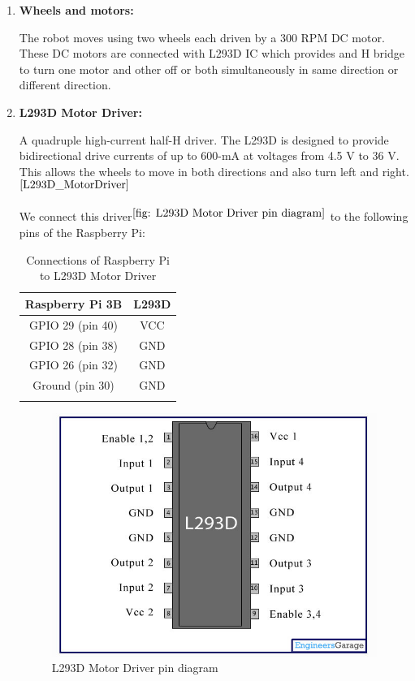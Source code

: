 \begin{enumerate}[topsep=-2pt, itemsep=2pt]
			
		
		
		
			
		\clearpage
		
		\item \textbf{Wheels and motors:} 
		
			The robot moves using two wheels each driven by a 300 RPM DC motor. These DC motors are connected with L293D IC which provides and H bridge to turn one motor and other off or both simultaneously in same direction or different direction. 
		
		
		\item \textbf{L293D Motor Driver:} 
		
			A quadruple high-current half-H driver. The L293D is designed to provide bidirectional drive currents of up to 600-mA at voltages from 4.5 V to 36 V. This allows the wheels to move in both directions and also turn left and right. ${}^{\cite{L293D_MotorDriver}}$
		
		
			We connect this driver${}^{\ref{fig: L293D Motor Driver pin diagram}}$ to the following pins of the Raspberry Pi:
	
			\tabulinesep=6pt	%
			\begin{longtabu} to \textwidth {| c | c | } \hline
				\centering 
				Raspberry Pi 3B & L293D \\ \hline
				GPIO 29 (pin 40) & VCC \\ 
				GPIO 28 (pin 38) & GND \\ 
				GPIO 26 (pin 32) & GND \\ 
				Ground (pin 30) & GND \\ \hline
				\caption{Connections of Raspberry Pi to L293D Motor Driver}
			\end{longtabu}
			
			\begin{figure}[!h]
				\centering
				\includegraphics[width=0.5\linewidth]{"./L293D.jpg"}
				\caption{L293D Motor Driver pin diagram}
				\label{fig: L293D Motor Driver pin diagram}
			\end{figure}
			

\end{enumerate}
